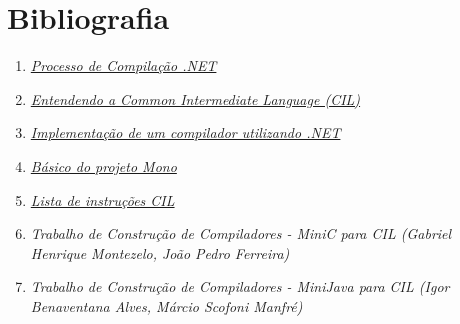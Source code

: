 \documentclass[hidelinks,12pt]{article}
\begin{document}
\section{Bibliografia}
	
    \begin{enumerate}
	\item \href {http://adrielcafe.com/artigos/18-processo-de-compilacao} 
	{\textit {Processo de Compilação .NET}}
	
	
	
	
   \item \href {http://www.codeproject.com/Articles/362076/Understanding-Common-Intermediate-Language-CIL} {\textit {Entendendo a Common Intermediate Language (CIL)}} 
	
    \item \href {http://campeche.inf.furb.br/tccs/2004-I/2004-1giancarlotomazellivf.pdf}{\textit {Implementação de um compilador utilizando .NET}}
	
	\item \href {http://www.mono-project.com/docs/getting-started/mono-basics/} {\textit   {Básico do projeto Mono}}
	
	\item \href {https://en.wikipedia.org/wiki/List_of_CIL_instructions}{ \textit {Lista de instruções CIL}}
	
    
	\item \textit { Trabalho de Construção de Compiladores - MiniC para CIL (Gabriel Henrique Montezelo, João Pedro Ferreira)}
	
	\item \textit { Trabalho de Construção de Compiladores - MiniJava para CIL (Igor Benaventana Alves, Márcio Scofoni Manfré)}
	\end{enumerate}
\end{document}
